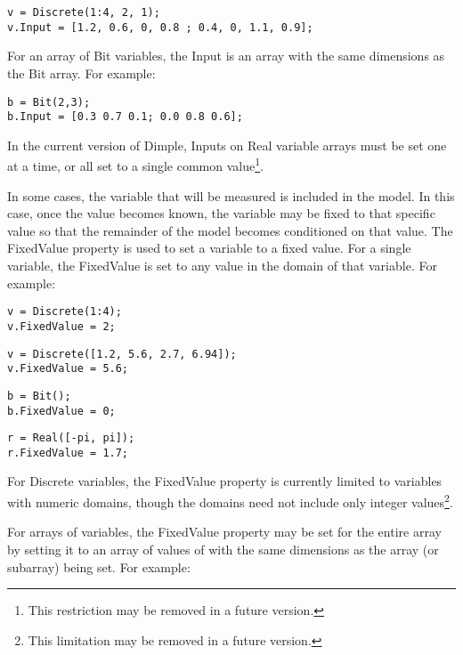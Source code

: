 \begin{lstlisting}
v = Discrete(1:4, 2, 1);
v.Input = [1.2, 0.6, 0, 0.8 ; 0.4, 0, 1.1, 0.9];
\end{lstlisting}

For an array of Bit variables, the Input is an array with the same dimensions as the Bit array.  For example:

\begin{lstlisting}
b = Bit(2,3);
b.Input = [0.3 0.7 0.1; 0.0 0.8 0.6];
\end{lstlisting}

In the current version of Dimple, Inputs on Real variable arrays must be set one at a time, or all set to a single common value\footnote{This restriction may be removed in a future version.}.



\label{sec:FixingAVariableValue}

In some cases, the variable that will be measured is included in the model.  In this case, once the value becomes known, the variable may be fixed to that specific value so that the remainder of the model becomes conditioned on that value.  The FixedValue property is used to set a variable to a fixed value.  For a single variable, the FixedValue is set to any value in the domain of that variable.  For example:

\begin{lstlisting}
v = Discrete(1:4);
v.FixedValue = 2;
\end{lstlisting}

\begin{lstlisting}
v = Discrete([1.2, 5.6, 2.7, 6.94]);
v.FixedValue = 5.6;
\end{lstlisting}

\begin{lstlisting}
b = Bit();
b.FixedValue = 0;
\end{lstlisting}

\begin{lstlisting}
r = Real([-pi, pi]);
r.FixedValue = 1.7;
\end{lstlisting}

For Discrete variables, the FixedValue property is currently limited to variables with numeric domains, though the domains need not include only integer values\footnote{This limitation may be removed in a future version.}.

For arrays of variables, the FixedValue property may be set for the entire array by setting it to an array of values of with the same dimensions as the array (or subarray) being set.  For example:

